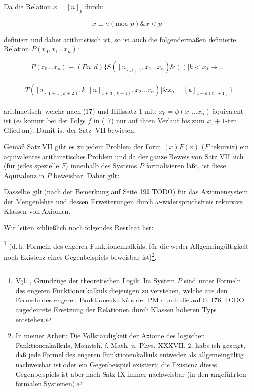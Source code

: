 \documentclass[draft]{scrartcl}
\newlength{\spacebetweenbreakedequations}
\newlength{\spaceafterbreakedequation}
\let\oldleft\left
\let\oldright\right
\def\left#1{%
	    \global\advance\bracketnum1\relax 
		\colorlet{temp}{.}%
		    \csname bracketcolor\the\bracketnum\endcsname
			\oldleft#1%
			    \color{temp}%
	}
\def\right#1{%
	    \colorlet{temp}{.}%
		\csname bracketcolor\the\bracketnum\endcsname
		    \oldright#1%
			\global\advance\bracketnum-1\relax
			    \color{temp}%
	}
\def\left#1{#1}
\def\right#1{#1}
\begin{document}
Da die Relation $x = \left[n\right]_p$ durch:

$$
x \equiv n \left(\text{mod } p\right) \& x < p
$$

definiert und daher arithmetisch ist, so ist auch die folgendermaßen definierte Relation $P\left(x_0, x_1 \dots x_n\right)$:

$$
P\left(x_0 \dots x_n\right) \equiv \left(En, d\right) \left\{S\left(\left[n\right]_{d + 1}, x_2 \dots x_n\right) \& \left(\right) \left[k < x_1 \longrightarrow\right.\right.
$$\\[\spacebetweenbreakedequations]
$$ \left.\left.T\left(\left[n\right]_{1 + 1 \left(k + 2\right)}, k, \left[n\right]_{1 + d \left(k + 1\right)}, x_2 \dots x_n\right)\right] \& x_0 = \left[n\right]_{1 + d \left(x_1 + 1\right)}\right\}
$$\\[\spaceafterbreakedequation]
arithmetisch, welche nach (17) und Hilfssatz 1 mit:
$x_0 = \phi\left(x_1 \dots x_n\right)$ äquivalent ist (es kommt
		bei der Folge $f$ in (17) nur auf ihren Verlauf 
		bis zum $x_1 + 1$-ten Glied an). Damit ist der
Satz~VII bewiesen.

Gemäß Satz VII gibt es zu jedem Problem der Form
$\left(x\right)F\left(x\right)$ ($F$ rekursiv) ein äquivalentes arithmetisches
Problem und da der ganze Beweis von Satz VII sich (für jedes spezielle $F$) innerhalb des Systems $P$ formalisieren läßt, ist diese Äquivalenz in $P$ beweisbar. Daher gilt:

\label{satzvii}

Dasselbe gilt (nach der Bemerkung auf Seite 190 TODO)
für das Axiomensystem der Mengenlehre und dessen Erweiterungen durch $\omega$-widerspruchsfreie rekursive
Klassen von Axiomen.

Wir leiten schließlich noch folgendes Resultat her:

\footnote{Vgl. , Grundzüge der theoretischen Logik. Im System $P$ sind unter Formeln des engeren Funktionenkalküls diejenigen zu verstehen, welche aus den Formeln des engeren Funktionenkalküls der PM durch die auf S. 176 TODO angedeutete Ersetzung der Relationen durch Klassen höheren Typs entstehen.}
(d.\,h. Formeln des engeren Funktionenkalküls, für die weder Allgemeingültigkeit noch Existenz eines Gegenbeispiels beweisbar ist)\footnote{In meiner Arbeit: Die Vollständigkeit der Axiome des logischen Funktionenkalküls, Monatsh. f. Math. u. Phys. XXXVII, 2, habe ich gezeigt, daß jede Formel des engeren Funktionenkalküls entweder als allgemeingültig nachweisbar ist oder ein Gegenbeispiel existiert; die Existenz dieses Gegenbeispiels ist aber nach Satz IX  immer nachweisbar (in den angeführten formalen Systemen).}.
\end{document}

